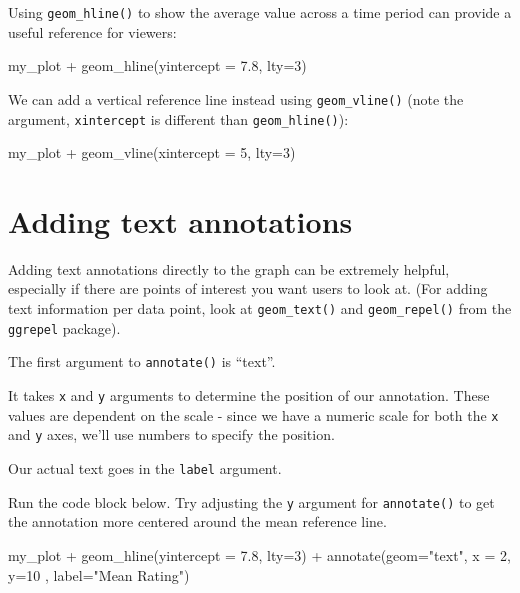 \documentclass[
  letterpaper,
  DIV=11,
  numbers=noendperiod]{scrreprt}
\newenvironment{Shaded}{\begin{snugshade}}{\end{snugshade}}
\newcommand{\NormalTok}[1]{\textcolor[rgb]{0.00,0.23,0.31}{#1}}
\begin{document}

Using \texttt{geom\_hline()} to show the average value across a time
period can provide a useful reference for viewers:

\begin{Shaded}
\begin{Highlighting}[]
\NormalTok{my\_plot + }
\NormalTok{  geom\_hline(yintercept = 7.8, lty=3)}
\end{Highlighting}
\end{Shaded}

We can add a vertical reference line instead using
\texttt{geom\_vline()} (note the argument, \texttt{xintercept} is
different than \texttt{geom\_hline()}):

\begin{Shaded}
\begin{Highlighting}[]
\NormalTok{my\_plot + }
\NormalTok{  geom\_vline(xintercept = 5, lty=3)}
\end{Highlighting}
\end{Shaded}

\section*{Adding text annotations}\label{adding-text-annotations}


Adding text annotations directly to the graph can be extremely helpful,
especially if there are points of interest you want users to look at.
(For adding text information per data point, look at
\texttt{geom\_text()} and \texttt{geom\_repel()} from the
\texttt{ggrepel} package).

The first argument to \texttt{annotate()} is ``text''.

It takes \texttt{x} and \texttt{y} arguments to determine the position
of our annotation. These values are dependent on the scale - since we
have a numeric scale for both the \texttt{x} and \texttt{y} axes, we'll
use numbers to specify the position.

Our actual text goes in the \texttt{label} argument.

Run the code block below. Try adjusting the \texttt{y} argument for
\texttt{annotate()} to get the annotation more centered around the mean
reference line.

\begin{Shaded}
\begin{Highlighting}[]
\NormalTok{my\_plot + }
\NormalTok{  geom\_hline(yintercept = 7.8, lty=3) +}
\NormalTok{  annotate(geom="text", x = 2, y=10 , label="Mean Rating") }
\end{Highlighting}
\end{Shaded}
\end{document}
